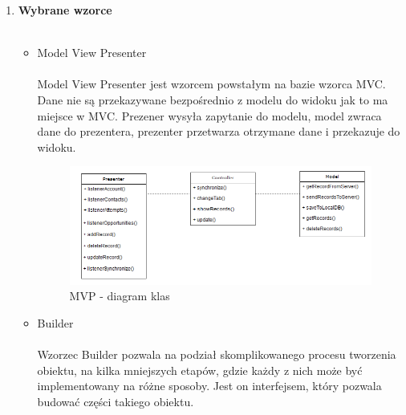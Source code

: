 \documentclass[a4paper,11pt]{article}
\begin{document}
\begin{enumerate}[leftmargin=0pt]
\begin{itemize}
    \end{itemize}

	
	
\newpage	
\newpage
	\item \textbf{{\Large Wybrane wzorce}}\\ \\
	\begin{itemize}
	    \item {\Large Model View Presenter}\\ \\
	    Model View Presenter jest wzorcem powstałym na bazie wzorca MVC. Dane nie są przekazywane bezpośrednio z modelu do widoku jak to ma miejsce w MVC. Prezener wysyła zapytanie do modelu, model zwraca dane do prezentera, prezenter przetwarza otrzymane dane i przekazuje do widoku.
	    
	    \begin{figure}[!htb]
	        \centerline{\includegraphics[scale=1]{mvp.png}}
	        \caption{{\footnotesize MVP - diagram klas}}
        \end{figure}
        
\newpage
        \item {\Large Builder}\\ \\
	    Wzorzec Builder pozwala na podział skomplikowanego procesu tworzenia obiektu, na kilka mniejszych etapów, gdzie każdy z nich może być implementowany na różne sposoby. Jest on interfejsem, który pozwala budować części takiego obiektu. 
	    

\end{itemize}
\end{enumerate}
\end{document}
